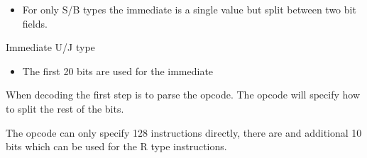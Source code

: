 \documentclass{report}
\begin{document}
\begin{description}
\begin{mdframed}
\begin{description}
\begin{itemize}
                        \item For only S/B types the immediate is a single value but
                            split between two bit fields.
                    \end{itemize}
                \item Immediate U/J type
                    \begin{itemize}
                        \item The first 20 bits are used for the immediate
                    \end{itemize}
            \end{description}

            When decoding the first step is to parse the opcode.
            The opcode will specify how to split the rest of the
            bits.

            The opcode can only specify 128 instructions directly,
            there are and additional 10 bits which can be used for
            the R type instructions.
        \end{mdframed}
\end{description}
\end{document}
